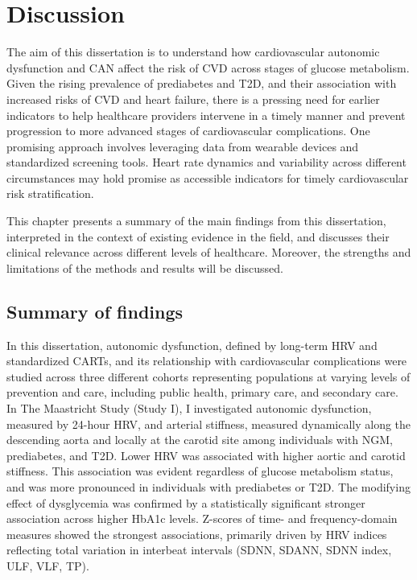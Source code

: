 \documentclass[
  letterpaper,
  headsepline=true,
  open=any]{scrbook}
\begin{document}
\restoregeometry


\hypertarget{discussion}{%
\chapter{Discussion}\label{discussion}}

\newpage

The aim of this dissertation is to understand how cardiovascular
autonomic dysfunction and CAN affect the risk of CVD across stages of
glucose metabolism. Given the rising prevalence of prediabetes and T2D,
and their association with increased risks of CVD and heart failure,
there is a pressing need for earlier indicators to help healthcare
providers intervene in a timely manner and prevent progression to more
advanced stages of cardiovascular complications. One promising approach
involves leveraging data from wearable devices and standardized
screening tools. Heart rate dynamics and variability across different
circumstances may hold promise as accessible indicators for timely
cardiovascular risk stratification.

This chapter presents a summary of the main findings from this
dissertation, interpreted in the context of existing evidence in the
field, and discusses their clinical relevance across different levels of
healthcare. Moreover, the strengths and limitations of the methods and
results will be discussed.

\newpage

\hypertarget{summary-of-findings}{%
\section{Summary of findings}\label{summary-of-findings}}

In this dissertation, autonomic dysfunction, defined by long-term HRV
and standardized CARTs, and its relationship with cardiovascular
complications were studied across three different cohorts representing
populations at varying levels of prevention and care, including public
health, primary care, and secondary care. In The Maastricht Study (Study
I), I investigated autonomic dysfunction, measured by 24-hour HRV, and
arterial stiffness, measured dynamically along the descending aorta and
locally at the carotid site among individuals with NGM, prediabetes, and
T2D. Lower HRV was associated with higher aortic and carotid stiffness.
This association was evident regardless of glucose metabolism status,
and was more pronounced in individuals with prediabetes or T2D. The
modifying effect of dysglycemia was confirmed by a statistically
significant stronger association across higher HbA1c levels. Z-scores of
time- and frequency-domain measures showed the strongest associations,
primarily driven by HRV indices reflecting total variation in interbeat
intervals (SDNN, SDANN, SDNN index, ULF, VLF, TP).
\end{document}

